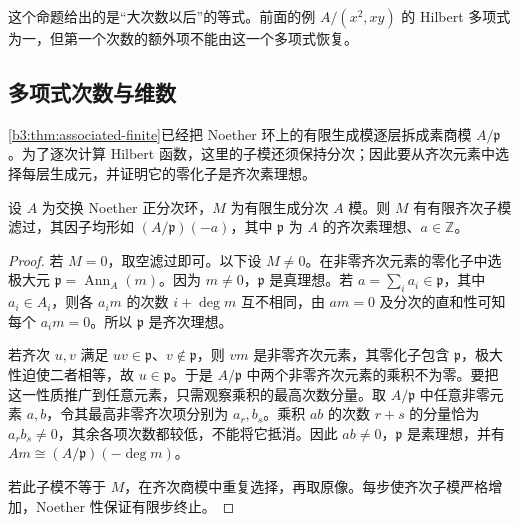 这个命题给出的是“大次数以后”的等式。前面的例 \(A/(x^2,xy)\) 的 Hilbert 多项式为一，但第一个次数的额外项不能由这一个多项式恢复。

\subsection{多项式次数与维数}
\label{b3:subsec:1103:02}

\cref{b3:thm:associated-finite}已经把 Noether 环上的有限生成模逐层拆成素商模 \(A/\mathfrak p\)。为了逐次计算 Hilbert 函数，这里的子模还须保持分次；因此要从齐次元素中选择每层生成元，并证明它的零化子是齐次素理想。

\begin{lemma}\label{b3:lem:homogeneous-prime-filtration}
	设 \(A\) 为交换 Noether 正分次环，\(M\) 为有限生成分次 \(A\) 模。则 \(M\) 有有限齐次子模滤过，其因子均形如 \((A/\mathfrak p)(-a)\)，其中 \(\mathfrak p\) 为 \(A\) 的齐次素理想、\(a\in\mathbb Z\)。
\end{lemma}
\begin{proof}
	若 \(M=0\)，取空滤过即可。以下设 \(M\ne0\)。在非零齐次元素的零化子中选极大元 \(\mathfrak p=\operatorname{Ann}_A(m)\)。因为 \(m\ne0\)，\(\mathfrak p\) 是真理想。若 \(a=\sum_i a_i\in\mathfrak p\)，其中 \(a_i\in A_i\)，则各 \(a_i m\) 的次数 \(i+\deg m\) 互不相同，由 \(am=0\) 及分次的直和性可知每个 \(a_i m=0\)。所以 \(\mathfrak p\) 是齐次理想。

	若齐次 \(u,v\) 满足 \(uv\in\mathfrak p\)、\(v\notin\mathfrak p\)，则 \(vm\) 是非零齐次元素，其零化子包含 \(\mathfrak p\)，极大性迫使二者相等，故 \(u\in\mathfrak p\)。于是 \(A/\mathfrak p\) 中两个非零齐次元素的乘积不为零。要把这一性质推广到任意元素，只需观察乘积的最高次数分量。取 \(A/\mathfrak p\) 中任意非零元素 \(a,b\)，令其最高非零齐次项分别为 \(a_r,b_s\)。乘积 \(ab\) 的次数 \(r+s\) 的分量恰为 \(a_rb_s\ne0\)，其余各项次数都较低，不能将它抵消。因此 \(ab\ne0\)，\(\mathfrak p\) 是素理想，并有 \(Am\cong(A/\mathfrak p)(-\deg m)\)。

	若此子模不等于 \(M\)，在齐次商模中重复选择，再取原像。每步使齐次子模严格增加，Noether 性保证有限步终止。
\end{proof}

